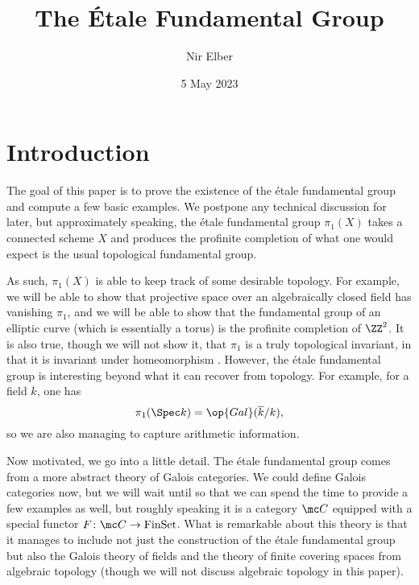 \documentclass{amsart}
\title{The \'Etale Fundamental Group}
\author{Nir Elber}
\date{5 May 2023}
\begin{document}

\maketitle

\setcounter{tocdepth}{2}
\tableofcontents

\section{Introduction}
The goal of this paper is to prove the existence of the \'etale fundamental group and compute a few basic examples. We postpone any technical discussion for later, but approximately speaking, the \'etale fundamental group $\pi_1(X)$ takes a connected scheme $X$ and produces the profinite completion of what one would expect is the usual topological fundamental group.

As such, $\pi_1(X)$ is able to keep track of some desirable topology. For example, we will be able to show that projective space over an algebraically closed field has vanishing $\pi_1$, and we will be able to show that the fundamental group of an elliptic curve (which is essentially a torus) is the profinite completion of $\ZZ^2$. It is also true, though we will not show it, that $\pi_1$ is a truly topological invariant, in that it is invariant under homeomorphism \cite[\href{https://stacks.math.columbia.edu/tag/0BQN}{Proposition 0BQN}]{stacks}. However, the \'etale fundamental group is interesting beyond what it can recover from topology. For example, for a field $k$, one has
\[\pi_1(\Spec k)=\op{Gal}(\overline k/k),\]
so we are also managing to capture arithmetic information.

Now motivated, we go into a little detail. The \'etale fundamental group comes from a more abstract theory of Galois categories. We could define Galois categories now, but we will wait until  so that we can spend the time to provide a few examples as well, but roughly speaking it is a category $\mc C$ equipped with a special functor $F\colon\mc C\to\mathrm{FinSet}$. What is remarkable about this theory is that it manages to include not just the construction of the \'etale fundamental group but also the Galois theory of fields and the theory of finite covering spaces from algebraic topology (though we will not discuss algebraic topology in this paper).
\end{document}
